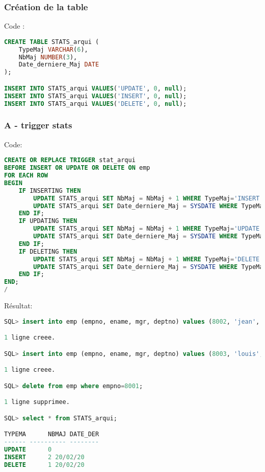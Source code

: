 \documentclass{article}
\begin{document}
\subsubsection{Création de la table}
Code :
\begin{lstlisting}[language=SQL,
    deletekeywords={char},
    morekeywords={DECLARE, LOOP, TYPE, FOR, IF, IS, OPEN, FETCH, DBMS_OUTPUT, PUT_LINE}]
CREATE TABLE STATS_arqui (
    TypeMaj VARCHAR(6),
    NbMaj NUMBER(3),
    Date_derniere_Maj DATE
);

INSERT INTO STATS_arqui VALUES('UPDATE', 0, null);
INSERT INTO STATS_arqui VALUES('INSERT', 0, null);
INSERT INTO STATS_arqui VALUES('DELETE', 0, null);
\end{lstlisting}

\subsubsection{A - trigger stats}
Code:
\begin{lstlisting}[language=SQL,
    deletekeywords={char},
    morekeywords={DECLARE, LOOP, TYPE, FOR, IF, IS, OPEN, FETCH, DBMS_OUTPUT, PUT_LINE}]
CREATE OR REPLACE TRIGGER stat_arqui
BEFORE INSERT OR UPDATE OR DELETE ON emp
FOR EACH ROW
BEGIN
    IF INSERTING THEN
        UPDATE STATS_arqui SET NbMaj = NbMaj + 1 WHERE TypeMaj='INSERT';
        UPDATE STATS_arqui SET Date_derniere_Maj = SYSDATE WHERE TypeMaj='INSERT';
    END IF;
    IF UPDATING THEN
        UPDATE STATS_arqui SET NbMaj = NbMaj + 1 WHERE TypeMaj='UPDATE';
        UPDATE STATS_arqui SET Date_derniere_Maj = SYSDATE WHERE TypeMaj='UPDATE';
    END IF;
    IF DELETING THEN
        UPDATE STATS_arqui SET NbMaj = NbMaj + 1 WHERE TypeMaj='DELETE';
        UPDATE STATS_arqui SET Date_derniere_Maj = SYSDATE WHERE TypeMaj='DELETE';
    END IF;
END;
/    
\end{lstlisting}
Résultat:
\begin{lstlisting}[language=SQL,
    deletekeywords={char},
    morekeywords={DECLARE, LOOP, TYPE, FOR, IF, IS, OPEN, FETCH, DBMS_OUTPUT, PUT_LINE}]
SQL> insert into emp (empno, ename, mgr, deptno) values (8002, 'jean', 7839, 65);

1 ligne creee.

SQL> insert into emp (empno, ename, mgr, deptno) values (8003, 'louis', 7839, 65);

1 ligne creee.

SQL> delete from emp where empno=8001;

1 ligne supprimee.

SQL> select * from STATS_arqui;

TYPEMA	    NBMAJ DATE_DER
------ ---------- --------
UPDATE		0
INSERT		2 20/02/20
DELETE		1 20/02/20
\end{lstlisting}
\end{document}
